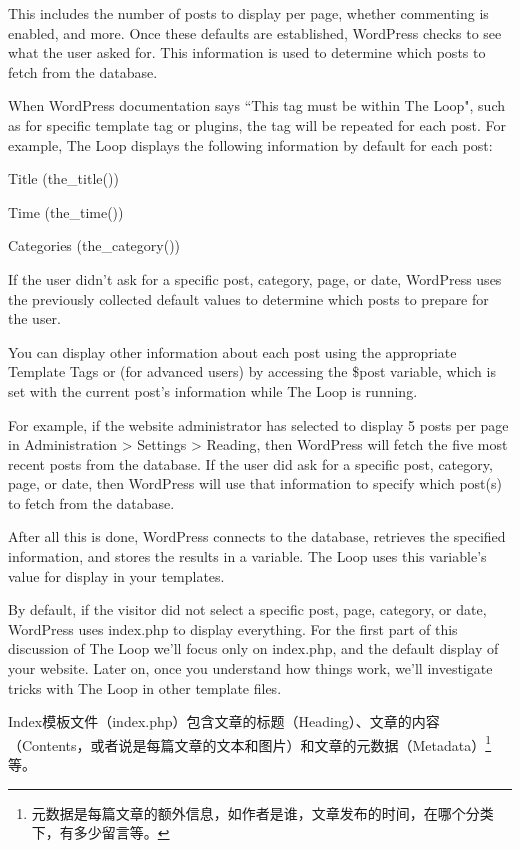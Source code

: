This includes the number of posts to display per page, whether commenting is enabled, and more. Once these defaults are established, WordPress checks to see what the user asked for. This information is used to determine which posts to fetch from the database.


When WordPress documentation says ``This tag must be within The Loop", such as for specific template tag or plugins, the tag will be repeated for each post. For example, The Loop displays the following information by default for each post:

\begin{compactitem}
\item Title (the\_title())
\item Time (the\_time())
\item Categories (the\_category())
\end{compactitem}

If the user didn't ask for a specific post, category, page, or date, WordPress uses the previously collected default values to determine which posts to prepare for the user.

You can display other information about each post using the appropriate Template Tags or (for advanced users) by accessing the \$post variable, which is set with the current post's information while The Loop is running.

For example, if the website administrator has selected to display 5 posts per page in Administration > Settings > Reading, then WordPress will fetch the five most recent posts from the database. If the user did ask for a specific post, category, page, or date, then WordPress will use that information to specify which post(s) to fetch from the database.

After all this is done, WordPress connects to the database, retrieves the specified information, and stores the results in a variable. The Loop uses this variable's value for display in your templates.

By default, if the visitor did not select a specific post, page, category, or date, WordPress uses index.php to display everything. For the first part of this discussion of The Loop we'll focus only on index.php, and the default display of your website. Later on, once you understand how things work, we'll investigate tricks with The Loop in other template files.


Index模板文件（index.php）包含文章的标题（Heading）、文章的内容（Contents，或者说是每篇文章的文本和图片）和文章的元数据（Metadata）\footnote{元数据是每篇文章的额外信息，如作者是谁，文章发布的时间，在哪个分类下，有多少留言等。}等。



